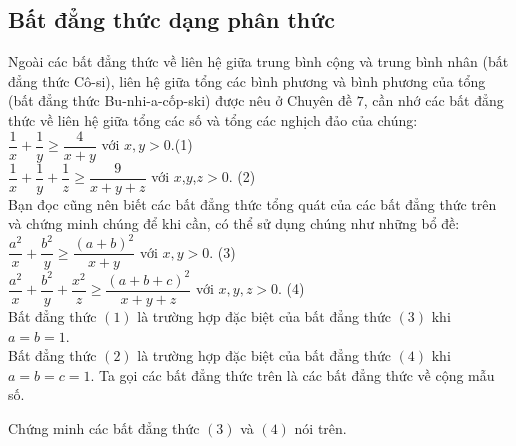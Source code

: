 \subsection{Bất đẳng thức dạng phân thức}

Ngoài các bất đẳng thức về liên hệ giữa trung bình cộng và trung bình nhân (bất đẳng thức Cô-si), liên hệ giữa tổng các bình phương và bình phương của tổng (bất đẳng thức Bu-nhi-a-cốp-ski) được nêu ở Chuyên đề $7$, cần nhớ các bất đẳng thức về liên hệ giữa tổng các số và tổng các nghịch đảo của chúng:\\
$\dfrac{1}{x}+\dfrac{1}{y}\ge \dfrac{4}{x+y}$ với $x,y>0$.\hfill (1)\\
$\dfrac{1}{x}+\dfrac{1}{y}+\dfrac{1}{z}\ge \dfrac{9}{x+y+z}$ với $x$,$y$,$z$$>0$.              \hfill (2)\\
Bạn đọc cũng nên biết các bất đẳng thức tổng quát của các bất đẳng thức trên và chứng minh chúng để khi cần, có thể sử dụng chúng như những bổ đề:\\
$\dfrac{a^2}{x}+\dfrac{b^2}{y}\ge \dfrac{(a+b)^2}{x+y}$ với $x,y>0$. \hfill (3)\\
$\dfrac{a^2}{x}+\dfrac{b^2}{y}+\dfrac{x^2}{z}\ge \dfrac{(a+b+c)^2}{x+y+z}$ với $x,y,z>0$. \hfill (4)\\
Bất đẳng thức $(1)$ là trường hợp đặc biệt của bất đẳng thức $(3)$ khi $a=b=1$.\\
Bất đẳng thức $(2)$ là trường hợp đặc biệt của bất đẳng thức $(4)$ khi $a=b=c=1$. Ta gọi các bất đẳng thức trên là các bất đẳng thức về cộng mẫu số.
\setcounter{vd}{98}
\begin{vd}
    Chứng minh các bất đẳng thức $(3)$ và $(4)$ nói trên.
\end{vd}$$
